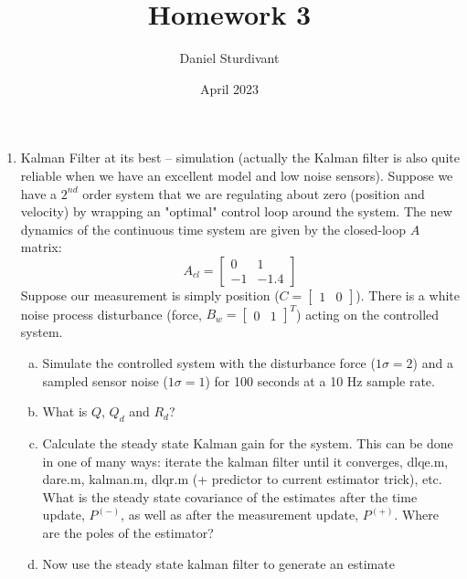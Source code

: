 \documentclass[11pt]{article}
\author{Daniel Sturdivant}
\title{Homework 3}
\date{April 2023}
\begin{document}
\maketitle
\thispagestyle{fancy}
\setlength{\parindent}{0pt}

\begin{enumerate}[label=\textbf{\arabic*.}]
  \itemsep 24pt
  \item Kalman Filter at its best – simulation (actually the Kalman filter is 
  also quite reliable when we have an excellent model and low noise sensors). 
  Suppose we have a $2^{nd}$ order system that we are regulating about zero 
  (position and velocity) by wrapping an "optimal" control loop around the 
  system. The new dynamics of the continuous time system are given by the 
  closed-loop $A$ matrix:
  \begin{equation*}
    A_{cl} = 
    \begin{bmatrix}
      0 & 1 \\ -1 & -1.4
    \end{bmatrix}
  \end{equation*}
  Suppose our measurement is simply position ($C=\begin{bmatrix} 1 & 0 
  \end{bmatrix}$). There is a white noise process disturbance (force, $B_w = 
  \begin{bmatrix} 0 & 1 \end{bmatrix}^T$) acting on the controlled system.
  \begin{enumerate}[(a)]
    \itemsep -2pt 
    \item Simulate the controlled system with the disturbance force 
    ($1\sigma=2$) and a sampled sensor noise ($1\sigma=1$) for 100 seconds at a 
    10 Hz sample rate.
    \item What is $Q$, $Q_d$ and $R_d$?
    \item Calculate the steady state Kalman gain for the system. This can be 
    done in one of many ways: iterate the kalman filter until it converges, 
    dlqe.m, dare.m, kalman.m, dlqr.m (+ predictor to current estimator trick), 
    etc. What is the steady state covariance of the estimates after the time 
    update, $P^{(-)}$, as well as after the measurement update, $P^{(+)}$. 
    Where are the poles of the estimator?
    \item Now use the steady state kalman filter to generate an estimate 

\end{enumerate}
\end{enumerate}
\end{document}
